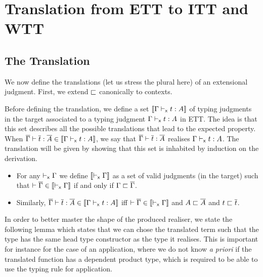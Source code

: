 \chapter{Translation from \acrshort{ETT} to \acrshort{ITT} and \acrshort{WTT}}

\section{The Translation}

We now define the translations (let us stress the plural here) of an
extensional judgment. First, we extend $\sqsubset$ canonically to contexts.

Before defining the translation, we define a set
$\llbracket \Gamma \vdash_{\mathsf{x}} t : A \rrbracket$ of typing judgments in the target associated to a
typing judgment $\Gamma \vdash_{\mathsf{x}} t : A$ in \acrshort{ETT}.
%
The idea is that this set describes all the possible translations that
lead to the expected property. When
$\overline{\Gamma} \vdash \overline{t} : \overline{A} \in \llbracket \Gamma \vdash_{\mathsf{x}} t : A \rrbracket$, we say that
$\overline{\Gamma} \vdash \overline{t} : \overline{A}$ realises $\Gamma \vdash_{\mathsf{x}} t : A$. The
translation will be given by showing that this set is inhabited by
induction on the derivation.

\begin{definition}
  \leavevmode
  \begin{itemize}
    \item For any $\vdash_{\mathsf{x}} \Gamma$ we define $\llbracket \vdash_{\mathsf{x}} \Gamma \rrbracket$ as a set of
    valid judgments (in the target) such that
    $\vdash \overline{\Gamma} \in \llbracket \vdash_{\mathsf{x}} \Gamma \rrbracket$ if and only if $\Gamma \sqsubset \overline{\Gamma}$.

    \item Similarly, $\overline{\Gamma} \vdash \overline{t} : \overline{A} \in \llbracket \Gamma \vdash_{\mathsf{x}} t : A \rrbracket$
    iff $\vdash \overline{\Gamma} \in \llbracket \vdash_{\mathsf{x}} \Gamma \rrbracket$ and $A \sqsubset \overline{A}$ and $t \sqsubset \overline{t}$.
  \end{itemize}
\end{definition}

In order to better master the shape of the produced realiser, we state the
following lemma which states that we can chose the translated term such that
the type has the same head type constructor as the type it realises.
%
This is important for instance for the case of an application, where we
do not know \emph{a priori} if the translated function has a dependent product
type, which is required to be able to use the typing rule for application.

